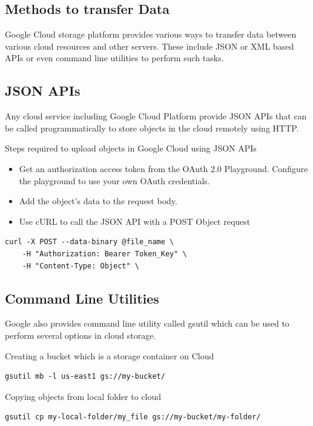 \subsection{Methods to transfer Data}

Google Cloud storage platform provides various ways to transfer data
between various cloud resources and other servers. These include JSON
or XML based APIs or even command line utilities to perform such tasks.

\subsection{JSON APIs}

Any cloud service including Google Cloud Platform provide JSON APIs
that can be called programmatically to store objects in the cloud
remotely using HTTP.

Steps required to upload objects in Google Cloud using JSON APIs
\begin{itemize}
\item Get an authorization access token from the OAuth 2.0
  Playground. Configure the playground to use your own OAuth
  credentials.
\item Add the object's data to the request body.
\item Use cURL to call the JSON API with a POST Object request
\end{itemize} 

\begin{verbatim}
curl -X POST --data-binary @file_name \
    -H "Authorization: Bearer Token_Key" \
    -H "Content-Type: Object" \
\end{verbatim}

\subsection{Command Line Utilities}

Google also provides command line utility called gsutil which can be
used to perform several options in cloud storage.

Creating a bucket which is a storage container on Cloud

\begin{verbatim}
gsutil mb -l us-east1 gs://my-bucket/
\end{verbatim}

Copying objects from local folder to cloud

\begin{verbatim}
gsutil cp my-local-folder/my_file gs://my-bucket/my-folder/
\end{verbatim}

